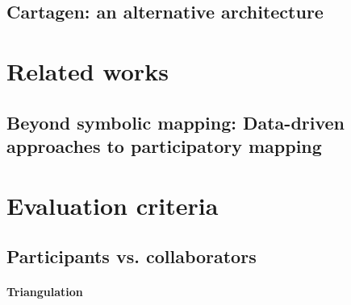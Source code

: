 \documentclass[11pt]{report}
\begin{document}
\section{Cartagen: an alternative architecture}

\chapter{Related works}
\section{Beyond symbolic mapping: Data-driven approaches to participatory mapping}

\chapter{Evaluation criteria}
\section{Participants vs. collaborators}
\subsubsection{Triangulation}
\end{document}
